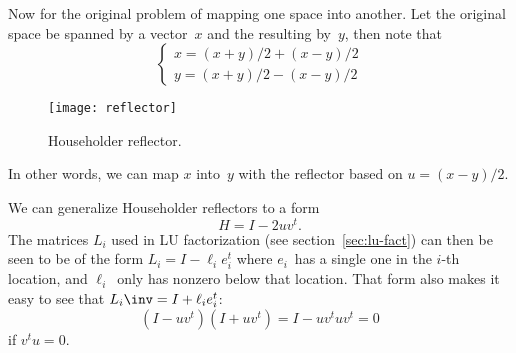 Now for the original problem of mapping one space into another. Let the original space be spanned
by a vector~$x$ and the resulting by~$y$, then note that 
\[ 
\begin{cases}
x = (x+y)/2 + (x-y)/2\\ y = (x+y)/2 - (x-y)/2
\end{cases}
\]
\begin{figure}[ht]
  \texttt{[image: reflector]}
  \caption{Householder reflector.}
  \label{fig:reflector}
\end{figure}
In other words, we can map $x$ into~$y$ with the reflector based on
$u=(x-y)/2$.

We can generalize Householder reflectors to a form \[ H=I-2uv^t. \]
The matrices $L_i$ used in LU factorization (see section~\ref{sec:lu-fact})
can then be seen to be of the form $L_i = I-\ell_ie_i^t$ where $e_i$~has a single one
in the $i$-th location, and $\ell_i$~only has nonzero below that location.
That form also makes it easy to see that $L_i\inv = I+\ell_ie_i^t$:
\[ (I-uv^t)(I+uv^t) = I-uv^tuv^t = 0 \]
if $v^tu=0$.



